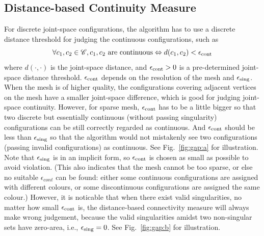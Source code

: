 \documentclass[Afour,sageh,times]{sagej}
\begin{document}
\subsection{Distance-based Continuity Measure}
For discrete joint-space configurations, the algorithm has to use a discrete distance threshold for judging the continuous configurations, such as
\begin{equation}\label{equ_continuous}
\forall c_1, c_2\in \mathscr{C}, c_1, c_2\mbox{ are continuous}\Leftrightarrow d(c_1, c_2) < \epsilon_{\rm cont}
\end{equation}
where $d(\cdot, \cdot)$ is the joint-space distance, and $\epsilon_{\rm cont} > 0$ is a pre-determined joint-space distance threshold. 
$\epsilon_{\rm cont}$ depends on the resolution of the mesh and $\epsilon_{\rm sing}$. 
When the mesh is of higher quality, the configurations covering adjacent vertices on the mesh have a smaller joint-space difference, which is good for judging joint-space continuity. 
However, for sparse mesh, $\epsilon_{\rm cont}$ has to be a little bigger so that two discrete but essentially continuous (without passing singularity) configurations can be still correctly regarded as continuous. 
And $\epsilon_{\rm cont}$ should be less than $\epsilon_{\rm sing}$ so that the algorithm would not mistakenly see two configurations (passing invalid configurations) as continuous. See Fig.~\ref{fig:gap:a} for illustration. Note that $\epsilon_{\rm sing}$ is in an implicit form, so $\epsilon_{\rm cont}$ is chosen as small as possible to avoid violation. 
(This also indicates that the mesh cannot be too sparse, or else no suitable $\epsilon_{cont}$ can be found: either some continuous configurations are assigned with different colours, or some discontinuous configurations are assigned the same colour.)
However, it is noticable that when there exist valid singularities, no matter how small $\epsilon_{\rm cont}$ is, the distance-based connectivity measure will always make wrong judgement, because the valid singularities amidst two non-singular sets have zero-area, i.e., $\epsilon_{\rm sing} = 0$. 
See Fig.~\ref{fig:gap:b} for illustration. 
\end{document}
